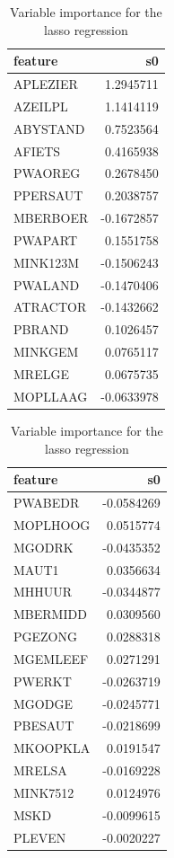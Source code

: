 \documentclass[
  12pt,
  oneside]{report}
\begin{document}
\begin{table}[H]
\caption{\label{tab:lasso}Variable importance for the lasso regression}

\centering
\fontsize{9}{11}\selectfont
\begin{tabular}[t]{l|r}
\hline
feature & s0\\
\hline
APLEZIER & 1.2945711\\
\hline
AZEILPL & 1.1414119\\
\hline
ABYSTAND & 0.7523564\\
\hline
AFIETS & 0.4165938\\
\hline
PWAOREG & 0.2678450\\
\hline
PPERSAUT & 0.2038757\\
\hline
MBERBOER & -0.1672857\\
\hline
PWAPART & 0.1551758\\
\hline
MINK123M & -0.1506243\\
\hline
PWALAND & -0.1470406\\
\hline
ATRACTOR & -0.1432662\\
\hline
PBRAND & 0.1026457\\
\hline
MINKGEM & 0.0765117\\
\hline
MRELGE & 0.0675735\\
\hline
MOPLLAAG & -0.0633978\\
\hline
\end{tabular}
\centering
\begin{tabular}[t]{l|r}
\hline
feature & s0\\
\hline
PWABEDR & -0.0584269\\
\hline
MOPLHOOG & 0.0515774\\
\hline
MGODRK & -0.0435352\\
\hline
MAUT1 & 0.0356634\\
\hline
MHHUUR & -0.0344877\\
\hline
MBERMIDD & 0.0309560\\
\hline
PGEZONG & 0.0288318\\
\hline
MGEMLEEF & 0.0271291\\
\hline
PWERKT & -0.0263719\\
\hline
MGODGE & -0.0245771\\
\hline
PBESAUT & -0.0218699\\
\hline
MKOOPKLA & 0.0191547\\
\hline
MRELSA & -0.0169228\\
\hline
MINK7512 & 0.0124976\\
\hline
MSKD & -0.0099615\\
\hline
PLEVEN & -0.0020227\\
\hline
\end{tabular}
\end{table}
\end{document}
